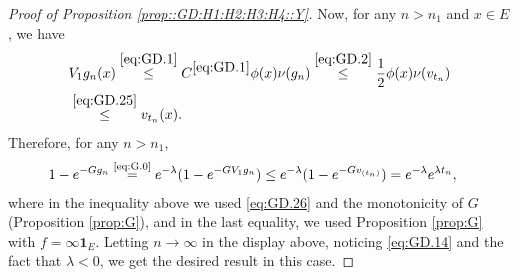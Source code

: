 \documentclass[12pt,a4paper]{amsart}
\numberwithin{equation}{section}
\theoremstyle{plain}
\theoremstyle{definition}
\theoremstyle{remark}
\begin{document}
\begin{proof}[Proof of Proposition \ref{prop::GD:H1:H2:H3:H4::Y}]
	Now, for any $n>n_1$ and $x\in E$, we have
\begin{align}
	& V_1g_n(x) 
	\overset{\eqref{eq:GD.1}}\leq C^{\eqref{eq:GD.1}} \phi(x)\nu(g_n)
	\overset{\eqref{eq:GD.2}}\leq \frac{1}{2}\phi(x)\nu(v_{t_n})
	\\\label{eq:GD.26} & \overset{\eqref{eq:GD.25}}\leq v_{t_n}(x).
\end{align}
	Therefore, for any $n>n_1$,
\begin{align}
	& 1 - e^{- Gg_n}
	\overset{\text{\eqref{eq:G.0}}}= e^{- \lambda} (1- e^{- GV_1g_n})
	\leq e^{- \lambda} (1- e^{- G v_{(t_n)}})
	= e^{- \lambda} e^{\lambda t_n},
\end{align}
	where in the inequality above we used \eqref{eq:GD.26} and the monotonicity of $G$ (Proposition \ref{prop:G}), and in the last equality, we used Proposition \ref{prop:G} with $f = \infty \mathbf 1_E$.
	Letting $n\to \infty$ in the display above, noticing \eqref{eq:GD.14} and the fact that $\lambda < 0$,
	we get the desired result in this case.


\end{proof}
\end{document}
